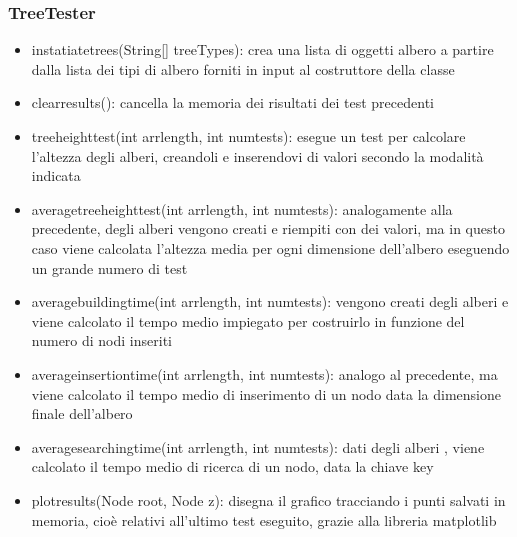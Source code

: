 \documentclass[a4paper,12pt]{article}
\begin{document}
    \subsubsection{TreeTester}
    \begin{itemize}
        \item instatiate\textunderscore trees(String[] treeTypes): crea una lista di oggetti albero a partire dalla
        lista dei tipi di albero forniti in input al costruttore della classe
        \item clear\textunderscore results(): cancella la memoria dei risultati dei test precedenti
        \item tree\textunderscore height\textunderscore test(int arr\textunderscore length, int num\textunderscore tests): esegue un test per
        calcolare l'altezza degli alberi, creandoli e inserendovi di valori secondo la modalità indicata
        \item average\textunderscore tree\textunderscore height\textunderscore test(int arr\textunderscore length, int num\textunderscore tests):
        analogamente alla precedente, degli alberi vengono creati e riempiti con dei valori, ma in questo caso viene
        calcolata l'altezza media per ogni dimensione dell'albero eseguendo un grande numero di test
        \item average\textunderscore building\textunderscore time(int arr\textunderscore length, int num\textunderscore tests): vengono creati
        degli alberi e viene calcolato il tempo medio impiegato per costruirlo in funzione del numero di nodi inseriti
        \item average\textunderscore insertion\textunderscore time(int arr\textunderscore length, int num\textunderscore tests): analogo al
        precedente, ma viene calcolato il tempo medio di inserimento di un nodo data la dimensione finale dell'albero
        \item average\textunderscore searching\textunderscore time(int arr\textunderscore length, int num\textunderscore tests): dati degli alberi
        , viene calcolato il tempo medio di ricerca di un nodo, data la chiave key
        \item plot\textunderscore results(Node root, Node z): disegna il grafico tracciando i punti salvati in
        memoria, cioè relativi all'ultimo test eseguito, grazie alla libreria matplotlib
    \end{itemize}
\end{document}

